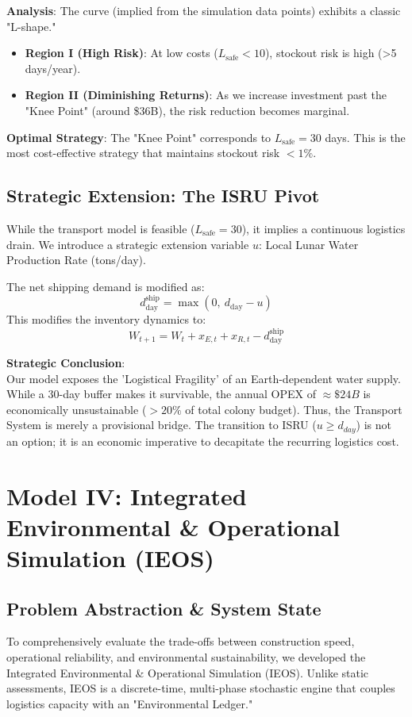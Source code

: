 \documentclass[11pt,letterpaper]{article}
\begin{document}
\noindent\textbf{Analysis}: The curve (implied from the simulation data points) exhibits a classic "L-shape."
\begin{itemize}
    \item \textbf{Region I (High Risk)}: At low costs ($L_{\text{safe}} < 10$), stockout risk is high (>5 days/year).
    \item \textbf{Region II (Diminishing Returns)}: As we increase investment past the "Knee Point" (around \$36B), the risk reduction becomes marginal.
\end{itemize}
\noindent\textbf{Optimal Strategy}: The "Knee Point" corresponds to $L_{\text{safe}}=30$ days. This is the most cost-effective strategy that maintains stockout risk $< 1\%$.

\subsection{Strategic Extension: The ISRU Pivot }
While the transport model is feasible ($L_{\text{safe}}=30$), it implies a continuous logistics drain. We introduce a strategic extension variable $u$: Local Lunar Water Production Rate (tons/day).

The net shipping demand is modified as:
\[
d_{\text{day}}^{\text{ship}} = \max(0, \ d_{\text{day}} - u)
\]
This modifies the inventory dynamics to:
\[
W_{t+1} = W_t + x_{E,t} + x_{R,t} - d_{\text{day}}^{\text{ship}}
\]

\noindent\textbf{Strategic Conclusion}: \\
Our model exposes the 'Logistical Fragility' of an Earth-dependent water supply. While a 30-day buffer makes it survivable, the annual OPEX of $\approx \$24B$ is economically unsustainable ($>20\%$ of total colony budget). Thus, the Transport System is merely a provisional bridge. The transition to ISRU ($u \ge d_{day}$) is not an option; it is an economic imperative to decapitate the recurring logistics cost.

\section{Model IV: Integrated Environmental \& Operational Simulation (IEOS)}
\subsection{Problem Abstraction \& System State}
To comprehensively evaluate the trade-offs between construction speed, operational reliability, and environmental sustainability, we developed the Integrated Environmental \& Operational Simulation (IEOS). Unlike static assessments, IEOS is a discrete-time, multi-phase stochastic engine that couples logistics capacity with an "Environmental Ledger."
\end{document}

